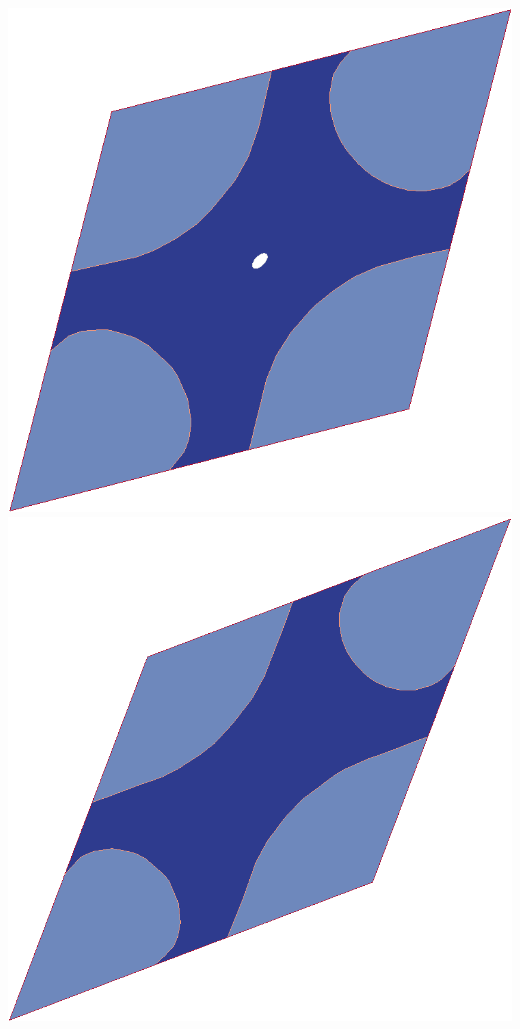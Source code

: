 \documentclass[11pt]{beamer} %
\begin{document}
\begin{frame}
\begin{center}
  \includegraphics[scale=0.10]{figures/evolve_shear_c}
  \includegraphics[scale=0.10]{figures/evolve_shear_d}
 \end{center}
\end{frame}
\end{document}
